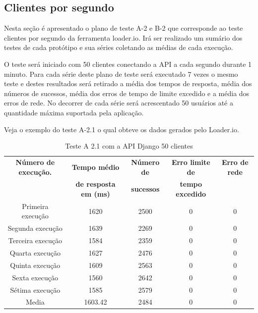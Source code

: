 \subsection{Clientes por segundo}

  Nesta seção é apresentado o plano de teste A-2 e B-2 que corresponde ao teste clientes por segundo da ferramenta loader.io. Irá
  ser realizado um sumário dos testes de cada protótipo e sua séries coletando as médias de cada execução.

  O teste será iniciado com 50 clientes conectando a API a cada segundo durante 1 minuto. Para cada série deste plano de teste
  será executado 7 vezes o mesmo teste e destes resultados será retirado a média dos tempos de resposta, média dos números de
  sucessos, média dos erros de tempo de limite excedido e a média dos erros de rede. No decorrer de cada série será acrescentado
  50 usuários até a quantidade máxima suportada pela aplicação.

  Veja o exemplo do teste A-2.1 o qual obteve os dados gerados pelo Loader.io.

  \begin{table}[H]
    \centering
    \footnotesize
    \setlength{\abovecaptionskip}{0pt}
    \setlength{\belowcaptionskip}{0pt}
    \caption[Teste A-2.1 com a API Django 50 clientes]{Teste A 2.1 com a API Django 50 clientes}
    \label{tab:teste-a-2-1}
    \begin{tabular}{c|c|c|c|c}
      \hline \hline
      \textbf{Número de execução.} & \textbf{Tempo médio } &	\textbf{Número de } & \textbf{Erro limite de} & \textbf{Erro de rede}  \\
	    {}			   & \textbf{de resposta em (ms) } &\textbf{sucessos } & \textbf{tempo excedido} & {}  \\
      \hline \hline
      Primeira execução &	1620 &				2500 &			0 &				0 \\
      Segunda execução &	1639 &				2269 &			0 &				0 \\
      Terceira execução &	1584 &				2359 &			0 &				0 \\
      Quarta execução  &	1627 &				2476 &			0 &				0 \\
      Quinta execução  &	1609 &				2563 &			0 &				0 \\
      Sexta execução   &	1560 &				2642 &			0 &				0 \\
      Sétima execução  &	1585 &				2579 &			0 &				0 \\
      Media & 			1603.42 &			2484 & 			0 &				0 \\
      \hline \hline
    \end{tabular}
  \end{table}

